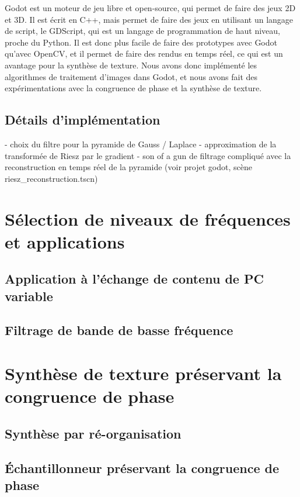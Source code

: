 Godot est un moteur de jeu libre et open-source, qui permet de faire des jeux 2D et 3D. Il est écrit en C++, mais permet de faire des jeux en utilisant un langage de script, le GDScript, qui est un langage de programmation de haut niveau, proche du Python. Il est donc plus facile de faire des prototypes avec Godot qu'avec OpenCV, et il permet de faire des rendus en temps réel, ce qui est un avantage pour la synthèse de texture. Nous avons donc implémenté les algorithmes de traitement d'images dans Godot, et nous avons fait des expérimentations avec la congruence de phase et la synthèse de texture.

\subsection{Détails d'implémentation}
- choix du filtre pour la pyramide de Gauss / Laplace
- approximation de la transformée de Riesz par le gradient
- son of a gun de filtrage compliqué avec la reconstruction en temps réel de la pyramide (voir projet godot, scène riesz\_reconstruction.tscn)

\section{Sélection de niveaux de fréquences et applications}

\subsection{Application à l'échange de contenu de PC variable}

\subsection{Filtrage de bande de basse fréquence}

\section{Synthèse de texture préservant la congruence de phase}

\subsection{Synthèse par ré-organisation}

\subsection{Échantillonneur préservant la congruence de phase}